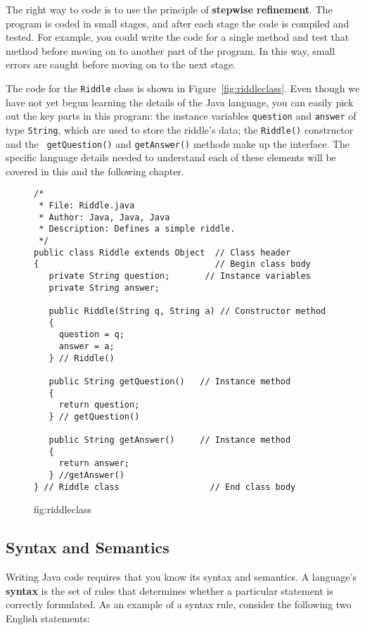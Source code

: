 The right way to code is to use the principle of {\bf stepwise refinement}. 
The program is coded in small stages, and after each stage the code is
compiled and tested.  For example, you could write the code for a
single method and test that method before moving on to another part of
the program. In this way, small errors are caught before moving on to
the next stage.

The code for the {\tt Riddle} class is shown in
Figure~\ref{fig:riddleclass}. Even though we have not yet begun
learning the details of the Java language, you can easily pick out the
key parts in this program: the instance variables {\tt question} and
{\tt answer} of type {\tt String}, which are used to store the
riddle's data; the {\tt Riddle()} constructor and the {\tt
getQuestion()} and {\tt getAnswer()} methods make up the interface.
The specific language details needed to understand each of these
elements will be covered in this and the following chapter.

\begin{figure}[tb]
\jjjprogstart
\begin{jjjlisting}
\begin{lstlisting}
/*
 * File: Riddle.java
 * Author: Java, Java, Java
 * Description: Defines a simple riddle.
 */
public class Riddle extends Object  // Class header
{                                   // Begin class body
   private String question;       // Instance variables
   private String answer;

   public Riddle(String q, String a) // Constructor method
   {
     question = q;
     answer = a;
   } // Riddle()

   public String getQuestion()   // Instance method
   {
     return question;
   } // getQuestion()

   public String getAnswer()     // Instance method
   {
     return answer;
   } //getAnswer()
} // Riddle class                  // End class body
\end{lstlisting}
\end{jjjlisting}
{fig:riddleclass}
\end{figure}

\subsection{Syntax and Semantics}
\noindent Writing Java code requires that you know its syntax and 
semantics.  A language's {\bf syntax} is the set of rules
that determines whether a particular statement is correctly
formulated.  As an example of a syntax rule, consider the following
two English statements:


